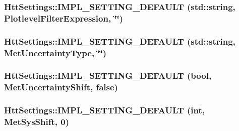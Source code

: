 \label{classHttSettings_aaacf2d8bb898b43bed3d12c702e7a2b1}
\hypertarget{classHttSettings_acbcc938324675f415c2eb56727fda6cf}{
\subsubsection[{IMPL\_\-SETTING\_\-DEFAULT}]{\setlength{\rightskip}{0pt plus 5cm}HttSettings::IMPL\_\-SETTING\_\-DEFAULT (std::string, \/  PlotlevelFilterExpression, \/  \char`\"{}\char`\"{})}}
\label{classHttSettings_acbcc938324675f415c2eb56727fda6cf}
\hypertarget{classHttSettings_a64be19c15dbd362e2c66ad4be1fd46dd}{
\subsubsection[{IMPL\_\-SETTING\_\-DEFAULT}]{\setlength{\rightskip}{0pt plus 5cm}HttSettings::IMPL\_\-SETTING\_\-DEFAULT (std::string, \/  MetUncertaintyType, \/  \char`\"{}\char`\"{})}}
\label{classHttSettings_a64be19c15dbd362e2c66ad4be1fd46dd}
\hypertarget{classHttSettings_a4e846de7937b2f2198769026a9e4231b}{
\subsubsection[{IMPL\_\-SETTING\_\-DEFAULT}]{\setlength{\rightskip}{0pt plus 5cm}HttSettings::IMPL\_\-SETTING\_\-DEFAULT (bool, \/  MetUncertaintyShift, \/  false)}}
\label{classHttSettings_a4e846de7937b2f2198769026a9e4231b}
\hypertarget{classHttSettings_a7e782c3ef47b58bd6771789bf644e957}{
\subsubsection[{IMPL\_\-SETTING\_\-DEFAULT}]{\setlength{\rightskip}{0pt plus 5cm}HttSettings::IMPL\_\-SETTING\_\-DEFAULT (int, \/  MetSysShift, \/  0)}}
\label{classHttSettings_a7e782c3ef47b58bd6771789bf644e957}

